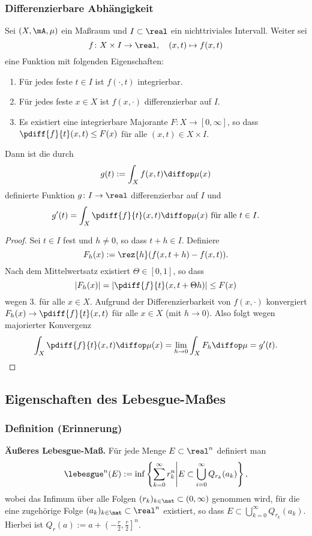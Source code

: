 \subsubsection{Differenzierbare Abhängigkeit}
\begin{thm}
 Sei $(X, \mA, \mu)$ ein Maßraum und $I \subset \real$ ein nichttriviales Intervall. Weiter sei 
 \[ f\colon X \times I \to \real, \quad (x,t) \mapsto f(x,t) \]
 eine Funktion mit folgenden Eigenschaften:
 \begin{enumerate}
  \item Für jedes feste $t \in I$ ist $f( \cdot, t )$ integrierbar.
  \item Für jedes feste $x \in X$ ist $f( x, \cdot )$ differenzierbar auf $I$.
  \item Es existiert eine integrierbare Majorante $F\colon X \to [0,\infty]$, so dass $\pdiff{f}{t}(x,t) \le F(x)$ für alle $(x,t) \in X \times I$.
 \end{enumerate}
 Dann ist die durch
 \[ g(t) := \int_X f(x,t) \diffop \mu(x)  \]
 definierte Funktion $g\colon I \to \real$ differenzierbar auf $I$ und
 \[ g'(t) = \int_X \pdiff{f}{t}(x,t) \diffop \mu(x) \text{ für alle } t \in I. \]
\end{thm}

\begin{proof}
 Sei $t \in I$ fest und $h \ne 0$, so dass $t+h \in I$. Definiere
 \[ F_h(x) := \rez{h}( f(x, t+h) - f(x,t) ). \]
 Nach dem Mittelwertsatz existiert $\Theta \in [0,1]$, so dass
 \[ |F_h(x)| = \left| \pdiff{f}{t} (x, t + \Theta h) \right| \le F(x) \]
 wegen 3. für alle $x \in X$. Aufgrund der Differenzierbarkeit von $f(x, \cdot)$ konvergiert $F_h(x) \to \pdiff{f}{t}(x,t)$ für alle $x \in X$ (mit $h \to 0$). Also folgt wegen majorierter Konvergenz
 \[ \int_X \pdiff{f}{t}(x,t) \diffop \mu(x) = \lim_{h \to 0} \int_X F_h \diffop \mu = g'(t). \qedhere \]
\end{proof}

\clearpage

\subsection{Eigenschaften des Lebesgue-Maßes}
\subsubsection{Definition (Erinnerung)}
 \textbf{Äußeres Lebesgue-Maß.} Für jede Menge $E \subset \real^n$ definiert man
 \[ \lebesgue^n( E ) := \inf \left\{ \sum_{k=0}^\infty r_k^n \middle| E \subset \bigcup_{i=0}^\infty Q_{r_k}(a_k) \right\}, \]
 wobei das Infimum über alle Folgen $(r_k)_{k \in \nat} \subset (0, \infty)$ genommen wird, für die eine zugehörige Folge $(a_k)_{k \in \nat} \subset \real^n$ existiert, so dass $E \subset \bigcup_{k=0}^\infty Q_{r_k}(a_k)$. Hierbei ist $Q_{r}(a) := a + \left(-\frac{r}{2}, \frac{r}{2} \right]^n$.

